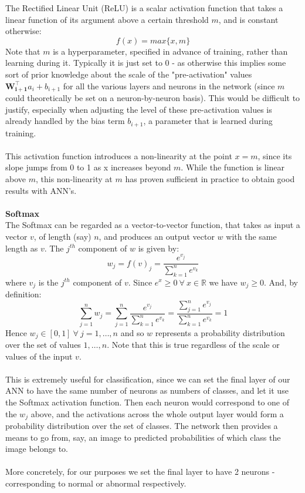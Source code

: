\documentclass[11pt]{article} %
\theoremstyle{plain}
\theoremstyle{definition}
\begin{document}
\noindent
The Rectified Linear Unit (ReLU) is a scalar activation function that takes a linear function of its argument above a certain threshold \(m\), and is constant otherwise:
\[f(x) = max\{x,m\} \] 
Note that \(m\) is a hyperparameter, specified in advance of training, rather than learning during it. Typically it is just set to 0 - as otherwise this implies some sort of prior knowledge about the scale of the "pre-activation" values \(\mathbf{W_{i+1}^{\top}}a_i + b_{i+1} \) for all the various layers and neurons in the network (since \(m\) could theoretically be set on a neuron-by-neuron basis). This would be difficult to justify, especially when adjusting the level of these pre-activation values is already handled by the bias term \(b_{i+1}\), a parameter that is learned during training.  
\\
\\
\noindent
This activation function introduces a non-linearity at the point \(x=m\), since its slope jumps from 0 to 1 as x increases beyond \(m\). While the function is linear above \(m\), this non-linearity at \(m\) has proven sufficient in practice to obtain good results with ANN's.
\\
\\
\noindent
\textbf{Softmax}
\\
\noindent
The Softmax can be regarded as a vector-to-vector function, that takes as input a vector \(v\), of length (say) \(n\), and produces an output vector \(w\) with the same length as \(v\). The \(j^{th}\) component of \(w\) is given by:
\[w_j = f(v)_j = \dfrac{e^{v_j}}{\sum_{k=1}^n e^{v_k}} \] 
where \(v_j\) is the \(j^{th}\) component of \(v\). Since \({e^x}\geq0 \ \forall \ x \in \mathbb{R} \) we have \(w_j\geq0\). And, by definition:
\[\sum_{j=1}^n w_j = \sum_{j=1}^n \dfrac{e^{v_j}}{\sum_{k=1}^n e^{v_k}} = \dfrac{\sum_{j=1}^n e^{v_j}}{\sum_{k=1}^n e^{v_k}} = 1\] 
Hence \(w_j \in [0,1] \ \forall \ j=1, \ldots,n\) and so \(w\) represents a probability distribution over the set of values \(1, \ldots,n\). Note that this is true regardless of the scale or values of the input \(v\). 
\\
\\
\noindent
This is extremely useful for classification, since we can set the final layer of our ANN to have the same number of neurons as numbers of classes, and let it use the Softmax activation function. Then each neuron would correspond to one of the \(w_j\) above, and the activations across the whole output layer would form a probability distribution over the set of classes. The network then provides a means to go from, say, an image to predicted probabilities of which class        the image belongs to. 
\\
\\
\noindent
More concretely, for our purposes we set the final layer to have 2 neurons - corresponding to normal or abnormal respectively.
\end{document}
